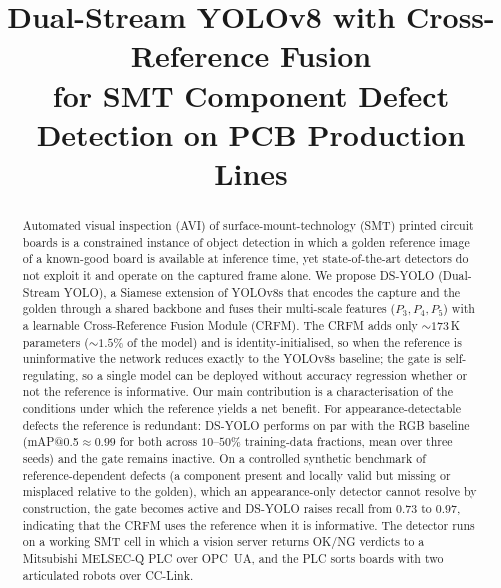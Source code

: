 \documentclass[conference]{IEEEtran}
\begin{document}
\title{Dual-Stream {YOLOv8} with Cross-Reference Fusion\\
       for {SMT} Component Defect Detection on {PCB} Production Lines}

\author{
\and
{}
}

\maketitle

\begin{abstract}
Automated visual inspection (AVI) of surface-mount-technology (SMT) printed
circuit boards is a constrained instance of object detection in which a golden
reference image of a known-good board is available at inference time, yet
state-of-the-art detectors do not exploit it and operate on the captured frame
alone. We propose DS-YOLO (Dual-Stream YOLO), a Siamese extension of YOLOv8s that
encodes the capture and the golden through a shared backbone and fuses their
multi-scale features ($P_3,P_4,P_5$) with a learnable Cross-Reference Fusion
Module (CRFM). The CRFM adds only ${\sim}173\,$K parameters (${\sim}1.5\%$ of the
model) and is identity-initialised, so when the reference is uninformative the
network reduces exactly to the YOLOv8s baseline; the gate is self-regulating, so a
single model can be deployed without accuracy regression whether or not the
reference is informative. Our main contribution is a characterisation of the
conditions under which the reference yields a net benefit. For
appearance-detectable defects the reference is redundant: DS-YOLO performs on par
with the RGB baseline (mAP@0.5${\approx}0.99$ for both across $10$--$50\%$
training-data fractions, mean over three seeds) and the gate remains inactive. On
a controlled synthetic benchmark of reference-dependent defects (a component
present and locally valid but missing or misplaced relative to the golden), which
an appearance-only detector cannot resolve by construction, the gate becomes
active and DS-YOLO raises recall from $0.73$ to $0.97$, indicating that the CRFM
uses the reference when it is informative. The detector runs on a working SMT cell in
which a vision server returns OK/NG verdicts to a Mitsubishi MELSEC-Q PLC over
OPC~UA, and the PLC sorts boards with two articulated robots over CC-Link.
\end{abstract}
\end{document}
